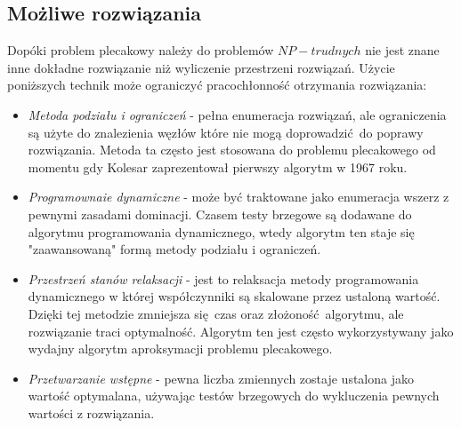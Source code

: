 \subsection{Możliwe rozwiązania}

Dopóki problem plecakowy należy do problemów $NP-trudnych$ nie jest znane inne dokładne rozwiązanie niż wyliczenie przestrzeni rozwiązań. Użycie poniższych technik może ograniczyć pracochłonność otrzymania rozwiązania:
\begin{itemize}
  \item \textit{Metoda podziału i ograniczeń} - pełna enumeracja rozwiązań, ale ograniczenia są użyte do znalezienia węzłów które nie mogą doprowadzić do poprawy rozwiązania. Metoda ta często jest stosowana do problemu plecakowego od momentu gdy Kolesar \cite{KolesarArticle} zaprezentował pierwszy algorytm w 1967 roku.
  \item \textit{Programownaie dynamiczne} - może być traktowane jako enumeracja wszerz z pewnymi zasadami dominacji. Czasem testy brzegowe są dodawane do algorytmu programowania dynamicznego, wtedy algorytm ten staje się "zaawansowaną" formą metody podziału i ograniczeń.
  \item \textit{Przestrzeń stanów relaksacji} - jest to relaksacja metody programowania dynamicznego w której współczynniki są skalowane przez ustaloną wartość. Dzięki tej metodzie zmniejsza się czas oraz złożoność algorytmu, ale rozwiązanie traci optymalność. Algorytm ten jest często wykorzystywany jako wydajny algorytm aproksymacji problemu plecakowego.
  \item \textit{Przetwarzanie wstępne} - pewna liczba zmiennych zostaje ustalona jako wartość optymalana, używając testów brzegowych do wykluczenia pewnych wartości z rozwiązania.
\end{itemize}
